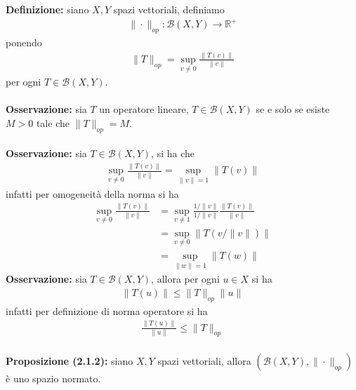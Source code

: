\documentclass{article}
\numberwithin{equation}{subsection}
\begin{document}
\textbf{Definizione:} siano $X, Y$ spazi vettoriali, definiamo
\begin{align*}
    \|\cdot\|_{op} : \mathcal{B}(X, Y) \longrightarrow \mathbb{R}^+ 
\end{align*}
ponendo
\begin{align*}
    \|T\|_{op} = \sup_{v \neq 0}\frac{\|T(v)\|}{\|v\|} 
\end{align*}
per ogni $T \in \mathcal{B}(X, Y)$. \\ \\
\textbf{Osservazione:} sia $T$ un operatore lineare, $T \in \mathcal{B}(X, Y)$ se e solo se esiste $M > 0$ tale che $\|T\|_{op} = M$. \\ \\
\textbf{Osservazione:} sia $T \in \mathcal{B}(X, Y)$, si ha che
\begin{align*}
    \sup_{v \neq 0}\frac{\|T(v)\|}{\|v\|} = \sup_{\|v\| = 1}\|T(v)\| 
\end{align*}
infatti per omogeneità della norma si ha
\begin{align*}
    \sup_{v \neq 0}\frac{\|T(v)\|}{\|v\|} &= \sup_{v \neq 1}\frac{1/\|v\|}{1/\|v\|}\frac{\|T(v)\|}{\|v\|}  \\
    &= \sup_{v \neq 0}\|T(v/\|v\|)\|  \\
    &= \sup_{\|w\| = 1}\|T(w)\| 
\end{align*}
\textbf{Osservazione:} sia $T \in \mathcal{B}(X, Y)$, allora per ogni $u \in X$ si ha
\begin{align*}
    \|T(u)\| \leq \|T\|_{op}\|u\| 
\end{align*}
infatti per definizione di norma operatore si ha
\begin{align*}
    \frac{\|T(u)\|}{\|u\|} \leq \|T\|_{op} 
\end{align*} \\
\textbf{Proposizione (2.1.2):} siano $X, Y$ spazi vettoriali, allora $(\mathcal{B}(X, Y), \|\cdot\|_{op})$ è uno spazio normato. \\
\end{document}
